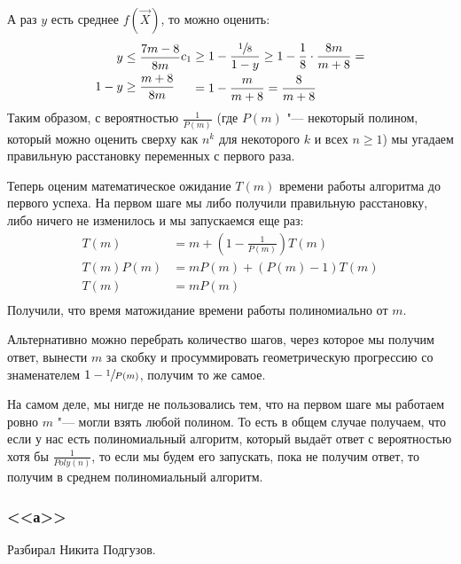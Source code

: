 	А раз $y$ есть среднее $f(\vec X)$, то можно оценить:
	\begin{gather*}
		\begin{aligned}
			y &\le \frac{7m-8}{8m} \\
			1 - y &\ge \frac{m+8}{8m} \\
		\end{aligned}
		\begin{aligned}
			c_1
				&\ge 1 - \frac{\sfrac 18}{1 - y}
				 \ge 1 - \frac 1 8 \cdot \frac{8m}{m+8} = \\
				&= 1 - \frac{m}{m+8}
				 = \frac{8}{m+8}
		\end{aligned}
	\end{gather*}	
	Таким образом, с вероятностью $\frac{1}{P(m)}$ (где $P(m)$ "--- некоторый полином,
	который можно оценить сверху как $n^k$ для некоторого $k$ и всех $n \ge 1$)
	мы угадаем правильную расстановку переменных с первого раза.

	Теперь оценим математическое ожидание $T(m)$ времени работы алгоритма до первого успеха.
	На первом шаге мы либо получили правильную расстановку, либо ничего не изменилось и мы запускаемся еще раз:
	\begin{align*}
		T(m) &= m + \left(1 - \frac{1}{P(m)}\right) T(m) \\
		T(m)P(m) &= mP(m) + (P(m)-1)T(m) \\
		T(m) &= mP(m) \\
	\end{align*}
	Получили, что время матожидание времени работы полиномиально от $m$.
	\begin{Rem}
		Альтернативно можно перебрать количество шагов, через которое мы получим ответ,
		вынести $m$ за скобку и просуммировать геометрическую прогрессию со знаменателем $1-\sfrac{1}{P(m)}$, получим то же самое.
	\end{Rem}
	\begin{assertion}
		На самом деле, мы нигде не пользовались тем, что на первом шаге мы работаем ровно $m$ "--- могли
		взять любой полином.
		То есть в общем случае получаем, что если у нас есть полиномиальный алгоритм, который
		выдаёт ответ с вероятностью хотя бы $\frac{1}{Poly(n)}$, то если мы будем его запускать,
		пока не получим ответ, то получим в среднем полиномиальный алгоритм.
	\end{assertion}

\subsubsection{<<а>>}
	Разбирал Никита Подгузов.


